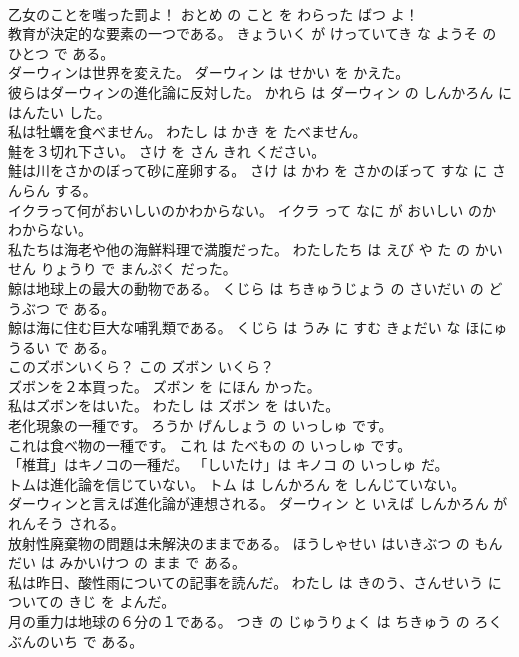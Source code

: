 \documentclass[8pt]{extreport}
\begin{document}
\begin{CJK}{UTF8}{min}
\\	乙女のことを嗤った罰よ！	おとめ の こと を わらった ばつ よ！	
\\	教育が決定的な要素の一つである。	きょういく が けっていてき な ようそ の ひとつ で ある。	
\\	ダーウィンは世界を変えた。	ダーウィン は せかい を かえた。	
\\	彼らはダーウィンの進化論に反対した。	かれら は ダーウィン の しんかろん に はんたい した。	
\\	私は牡蠣を食べません。	わたし は かき を たべません。	
\\	鮭を３切れ下さい。	さけ を さん きれ ください。	
\\	鮭は川をさかのぼって砂に産卵する。	さけ は かわ を さかのぼって すな に さんらん する。	
\\	イクラって何がおいしいのかわからない。	イクラ って なに が おいしい のか わからない。	
\\	私たちは海老や他の海鮮料理で満腹だった。	わたしたち は えび や た の かいせん りょうり で まんぷく だった。	
\\	鯨は地球上の最大の動物である。	くじら は ちきゅうじょう の さいだい の どうぶつ で ある。	
\\	鯨は海に住む巨大な哺乳類である。	くじら は うみ に すむ きょだい な ほにゅうるい で ある。	
\\	このズボンいくら？	この ズボン いくら？	
\\	ズボンを２本買った。	ズボン を にほん かった。	
\\	私はズボンをはいた。	わたし は ズボン を はいた。	
\\	老化現象の一種です。	ろうか げんしょう の いっしゅ です。	
\\	これは食べ物の一種です。	これ は たべもの の いっしゅ です。	
\\	「椎茸」はキノコの一種だ。	「しいたけ」は キノコ の いっしゅ だ。	
\\	トムは進化論を信じていない。	トム は しんかろん を しんじていない。	
\\	ダーウィンと言えば進化論が連想される。	ダーウィン と いえば しんかろん が れんそう される。	
\\	放射性廃棄物の問題は未解決のままである。	ほうしゃせい はいきぶつ の もんだい は みかいけつ の まま で ある。	
\\	私は昨日、酸性雨についての記事を読んだ。	わたし は きのう、さんせいう についての きじ を よんだ。	
\\	月の重力は地球の６分の１である。	つき の じゅうりょく は ちきゅう の ろくぶんのいち で ある。	

\end{CJK}
\end{document}
